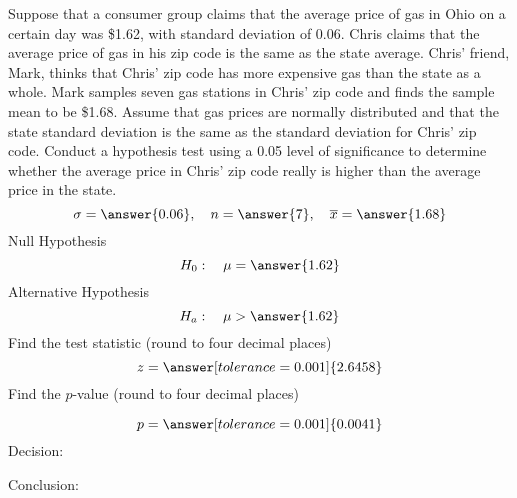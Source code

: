 \documentclass{ximera}
\begin{document}
\begin{problem}\label{prob:140hom8prob5}
Suppose that a consumer group claims that the average price of gas in Ohio on a certain day was \$1.62, with standard deviation of 0.06.  Chris claims that the average price of gas in his zip code is the same as the state average.  Chris' friend, Mark, thinks that Chris' zip code has more expensive gas than the state as a whole.  Mark samples seven gas stations in Chris' zip code and finds the sample mean to be \$1.68.  Assume that gas prices are normally distributed and that the state standard deviation is the same as the standard deviation for Chris' zip code. Conduct a hypothesis test using a 0.05 level of significance to determine whether the average price in Chris' zip code really is higher than the average price in the state.
$$\sigma=\answer{0.06},\quad n=\answer{7},\quad \overline{x}=\answer{1.68}$$
Null Hypothesis
$$H_0:\quad \mu=\answer{1.62}$$
Alternative Hypothesis
$$H_a:\quad \mu>\answer{1.62}$$
Find the test statistic (round to four decimal places)
$$z=\answer[tolerance=0.001]{2.6458}$$
Find the $p$-value (round to four decimal places)
\begin{center}  
\end{center}
$$p=\answer[tolerance=0.001]{0.0041}$$
Decision:

\begin{multipleChoice} 
\end{multipleChoice}  

Conclusion:

\begin{multipleChoice} 
\end{multipleChoice} 

\end{problem}
 
\end{document}
